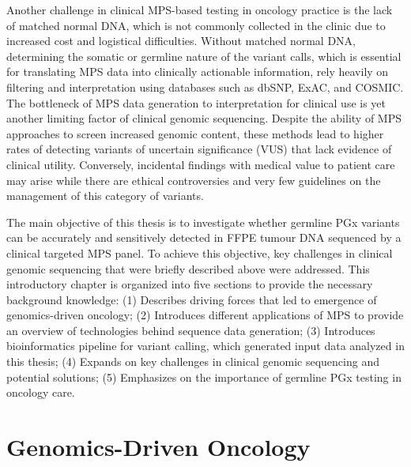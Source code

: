 Another challenge in clinical MPS-based testing in oncology practice is the lack of matched normal DNA, which is not commonly collected in the clinic due to increased cost and logistical difficulties. Without matched normal DNA, determining the somatic or germline nature of the variant calls, which is essential for translating MPS data into clinically actionable information, rely heavily on filtering and interpretation using databases such as dbSNP, ExAC, and COSMIC. The bottleneck of MPS data generation to interpretation for clinical use is yet another limiting factor of clinical genomic sequencing. Despite the ability of MPS approaches to screen increased genomic content, these methods lead to higher rates of detecting variants of uncertain significance (VUS) that lack evidence of clinical utility. Conversely, incidental findings with medical value to patient care may arise while there are ethical controversies and very few guidelines on the management of this category of variants.

The main objective of this thesis is to investigate whether germline PGx variants can be accurately and sensitively detected in FFPE tumour DNA sequenced by a clinical targeted MPS panel. To achieve this objective, key challenges in clinical genomic sequencing that were briefly described above were addressed. This introductory chapter is organized into five sections to provide the necessary background knowledge: (1) Describes driving forces that led to emergence of genomics-driven oncology; (2) Introduces different applications of MPS to provide an overview of technologies behind sequence data generation; (3) Introduces bioinformatics pipeline for variant calling, which generated input data analyzed in this thesis; (4) Expands on key challenges in clinical genomic sequencing and potential solutions; (5) Emphasizes on the importance of germline PGx testing in oncology care.

\section{Genomics-Driven Oncology}
\label{sec:Genomics-DrivenOncology}

